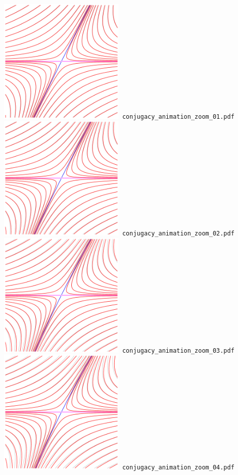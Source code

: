 \documentclass[a4paper]{amsart}
\begin{document}
\includegraphics[width=6cm]{conjugacy_animation_zoom_01.pdf}\verb+ conjugacy_animation_zoom_01.pdf+\\
\includegraphics[width=6cm]{conjugacy_animation_zoom_02.pdf}\verb+ conjugacy_animation_zoom_02.pdf+\\
\includegraphics[width=6cm]{conjugacy_animation_zoom_03.pdf}\verb+ conjugacy_animation_zoom_03.pdf+\\
\includegraphics[width=6cm]{conjugacy_animation_zoom_04.pdf}\verb+ conjugacy_animation_zoom_04.pdf+\\
\end{document}
